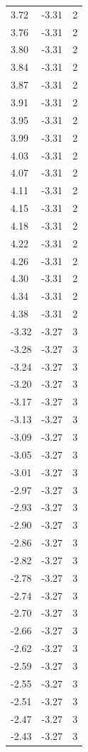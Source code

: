 \begin{longtable}{lrr}
  3.72 & -3.31 & 2 \\
  3.76 & -3.31 & 2 \\
  3.80 & -3.31 & 2 \\
  3.84 & -3.31 & 2 \\
  3.87 & -3.31 & 2 \\
  3.91 & -3.31 & 2 \\
  3.95 & -3.31 & 2 \\
  3.99 & -3.31 & 2 \\
  4.03 & -3.31 & 2 \\
  4.07 & -3.31 & 2 \\
  4.11 & -3.31 & 2 \\
  4.15 & -3.31 & 2 \\
  4.18 & -3.31 & 2 \\
  4.22 & -3.31 & 2 \\
  4.26 & -3.31 & 2 \\
  4.30 & -3.31 & 2 \\
  4.34 & -3.31 & 2 \\
  4.38 & -3.31 & 2 \\
  -3.32 & -3.27 & 3 \\
  -3.28 & -3.27 & 3 \\
  -3.24 & -3.27 & 3 \\
  -3.20 & -3.27 & 3 \\
  -3.17 & -3.27 & 3 \\
  -3.13 & -3.27 & 3 \\
  -3.09 & -3.27 & 3 \\
  -3.05 & -3.27 & 3 \\
  -3.01 & -3.27 & 3 \\
  -2.97 & -3.27 & 3 \\
  -2.93 & -3.27 & 3 \\
  -2.90 & -3.27 & 3 \\
  -2.86 & -3.27 & 3 \\
  -2.82 & -3.27 & 3 \\
  -2.78 & -3.27 & 3 \\
  -2.74 & -3.27 & 3 \\
  -2.70 & -3.27 & 3 \\
  -2.66 & -3.27 & 3 \\
  -2.62 & -3.27 & 3 \\
  -2.59 & -3.27 & 3 \\
  -2.55 & -3.27 & 3 \\
  -2.51 & -3.27 & 3 \\
  -2.47 & -3.27 & 3 \\
  -2.43 & -3.27 & 3 \\

\end{longtable}
